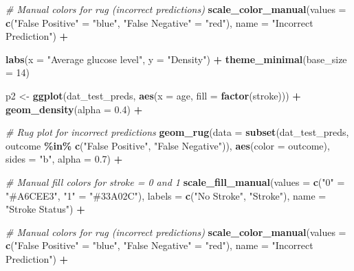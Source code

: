 \documentclass[
]{article}
\newenvironment{Shaded}{\begin{snugshade}}{\end{snugshade}}
\newcommand{\AttributeTok}[1]{\textcolor[rgb]{0.13,0.29,0.53}{#1}}
\newcommand{\CommentTok}[1]{\textcolor[rgb]{0.56,0.35,0.01}{\textit{#1}}}
\newcommand{\DecValTok}[1]{\textcolor[rgb]{0.00,0.00,0.81}{#1}}
\newcommand{\FloatTok}[1]{\textcolor[rgb]{0.00,0.00,0.81}{#1}}
\newcommand{\FunctionTok}[1]{\textcolor[rgb]{0.13,0.29,0.53}{\textbf{#1}}}
\newcommand{\NormalTok}[1]{#1}
\newcommand{\OtherTok}[1]{\textcolor[rgb]{0.56,0.35,0.01}{#1}}
\newcommand{\SpecialCharTok}[1]{\textcolor[rgb]{0.81,0.36,0.00}{\textbf{#1}}}
\newcommand{\StringTok}[1]{\textcolor[rgb]{0.31,0.60,0.02}{#1}}
\begin{document}
\begin{Shaded}
\begin{Highlighting}[]
  \CommentTok{\# Manual colors for rug (incorrect predictions)}
  \FunctionTok{scale\_color\_manual}\NormalTok{(}\AttributeTok{values =} \FunctionTok{c}\NormalTok{(}\StringTok{"False Positive"} \OtherTok{=} \StringTok{"blue"}\NormalTok{, }\StringTok{"False Negative"} \OtherTok{=} \StringTok{"red"}\NormalTok{),}
                     \AttributeTok{name =} \StringTok{"Incorrect Prediction"}\NormalTok{) }\SpecialCharTok{+}

  \FunctionTok{labs}\NormalTok{(}\AttributeTok{x =} \StringTok{"Average glucose level"}\NormalTok{, }\AttributeTok{y =} \StringTok{"Density"}\NormalTok{) }\SpecialCharTok{+}
  \FunctionTok{theme\_minimal}\NormalTok{(}\AttributeTok{base\_size =} \DecValTok{14}\NormalTok{)}



\NormalTok{p2 }\OtherTok{\textless{}{-}} \FunctionTok{ggplot}\NormalTok{(dat\_test\_preds, }\FunctionTok{aes}\NormalTok{(}\AttributeTok{x =}\NormalTok{ age, }\AttributeTok{fill =} \FunctionTok{factor}\NormalTok{(stroke))) }\SpecialCharTok{+}
  \FunctionTok{geom\_density}\NormalTok{(}\AttributeTok{alpha =} \FloatTok{0.4}\NormalTok{) }\SpecialCharTok{+}
  
  \CommentTok{\# Rug plot for incorrect predictions}
  \FunctionTok{geom\_rug}\NormalTok{(}\AttributeTok{data =} \FunctionTok{subset}\NormalTok{(dat\_test\_preds, outcome }\SpecialCharTok{\%in\%} \FunctionTok{c}\NormalTok{(}\StringTok{"False Positive"}\NormalTok{, }\StringTok{"False Negative"}\NormalTok{)),}
           \FunctionTok{aes}\NormalTok{(}\AttributeTok{color =}\NormalTok{ outcome),}
           \AttributeTok{sides =} \StringTok{"b"}\NormalTok{, }\AttributeTok{alpha =} \FloatTok{0.7}\NormalTok{) }\SpecialCharTok{+}
  
  \CommentTok{\# Manual fill colors for stroke = 0 and 1}
  \FunctionTok{scale\_fill\_manual}\NormalTok{(}\AttributeTok{values =} \FunctionTok{c}\NormalTok{(}\StringTok{"0"} \OtherTok{=} \StringTok{"\#A6CEE3"}\NormalTok{, }\StringTok{"1"} \OtherTok{=} \StringTok{"\#33A02C"}\NormalTok{),}
                    \AttributeTok{labels =} \FunctionTok{c}\NormalTok{(}\StringTok{"No Stroke"}\NormalTok{, }\StringTok{"Stroke"}\NormalTok{),}
                    \AttributeTok{name =} \StringTok{"Stroke Status"}\NormalTok{) }\SpecialCharTok{+}
  
  \CommentTok{\# Manual colors for rug (incorrect predictions)}
  \FunctionTok{scale\_color\_manual}\NormalTok{(}\AttributeTok{values =} \FunctionTok{c}\NormalTok{(}\StringTok{"False Positive"} \OtherTok{=} \StringTok{"blue"}\NormalTok{, }\StringTok{"False Negative"} \OtherTok{=} \StringTok{"red"}\NormalTok{),}
                     \AttributeTok{name =} \StringTok{"Incorrect Prediction"}\NormalTok{) }\SpecialCharTok{+}


\end{Highlighting}
\end{Shaded}
\end{document}
